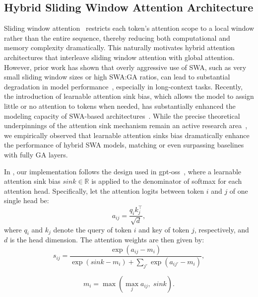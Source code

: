 \subsection{Hybrid Sliding Window Attention Architecture}

Sliding window attention~\citep{beltagy2020longformer} restricts each token’s attention scope to a local window rather than the entire sequence, thereby reducing both computational and memory complexity dramatically.
This naturally motivates hybrid attention architectures that interleave sliding window attention with global attention.
However, prior work has shown that overly aggressive use of SWA, such as very small sliding window sizes or high SWA:GA ratios, can lead to substantial degradation in model performance~\citep{team2025gemma}, especially in long-context tasks.
Recently, the introduction of learnable attention sink bias, which allows the model to assign little or no attention to tokens when needed, has substantially enhanced the modeling capacity of SWA-based architectures~\citep{agarwal2025gpt}.
While the precise theoretical underpinnings of the attention sink mechanism remain an active research area~\citep{xiao2023efficient, attnsink_study, qiu2025gatedattn, sun2024massive}, we empirically observed that learnable attention sinks bias dramatically enhance the performance of hybrid SWA models, matching or even surpassing baselines with fully GA layers.

In \mimoflash{}, our implementation follows the design used in gpt-oss~\citep{agarwal2025gpt}, where a learnable attention sink bias $sink \in \mathbb{R}$ is applied to the denominator of softmax for each attention head. Specifically, let the attention logits between token $i$ and $j$ of one single head be:
\begin{equation}
a_{ij} = \frac{q_ik_j^\top}{\sqrt{d}},
\end{equation}
where $q_i$ and $k_j$ denote the query of token $i$ and key of token $j$, respectively, and $d$ is the head dimension.  
The attention weights are then given by:
\begin{equation}
s_{ij}
= \frac{\exp \left( a_{ij} - m_i \right)}
{\exp \left( sink - m_i \right) + \sum_{j'} \exp \left( a_{ij'} - m_i \right)},
\end{equation}

\begin{equation}
m_i = \max \left( \max_j a_{ij}, \; sink \right).
\end{equation}

